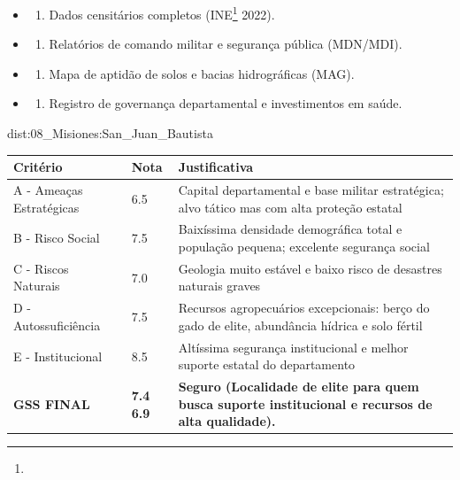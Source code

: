 {\begin{itemize}
\tightlist
\item
  \begin{enumerate}
  \def\labelenumi{\arabic{enumi})}
  \tightlist
  \item
    Dados censitários completos (INE\footnote{\fineINE} 2022).
  \end{enumerate}
\item
  \begin{enumerate}
  \def\labelenumi{\arabic{enumi})}
  \setcounter{enumi}{1}
  \tightlist
  \item
    Relatórios de comando militar e segurança pública (MDN/\allowbreak MDI).
  \end{enumerate}
\item
  \begin{enumerate}
  \def\labelenumi{\arabic{enumi})}
  \setcounter{enumi}{2}
  \tightlist
  \item
    Mapa de aptidão de solos e bacias hidrográficas (MAG).
  \end{enumerate}
\item
  \begin{enumerate}
  \def\labelenumi{\arabic{enumi})}
  \setcounter{enumi}{3}
  \tightlist
  \item
    Registro de governança departamental e investimentos em saúde.
  \end{enumerate}
\end{itemize}}{dist:08_Misiones:San_Juan_Bautista}
\begin{table}[ht!]
\small \begin{tabular}{p{3.0cm}p{0.8cm}p{6.0cm}} \toprule
\textbf{Critério} & \textbf{Nota} & \textbf{Justificativa} \\ \midrule
A - Ameaças Estratégicas & 6.5 & Capital departamental e base militar estratégica; alvo tático mas com alta proteção estatal \\
B - Risco Social & 7.5 & Baixíssima densidade demográfica total e população pequena; excelente segurança social \\
C - Riscos Naturais & 7.0 & Geologia muito estável e baixo risco de desastres naturais graves \\
D - Autossuficiência & 7.5 & Recursos agropecuários excepcionais: berço do gado de elite, abundância hídrica e solo fértil \\
E - Institucional & 8.5 & Altíssima segurança institucional e melhor suporte estatal do departamento \\
\midrule \textbf{GSS FINAL} & \textbf{7.4
6.9} & \textbf{Seguro (Localidade de elite para quem busca suporte institucional e recursos de alta qualidade).} \\ \bottomrule \end{tabular}
\end{table}
